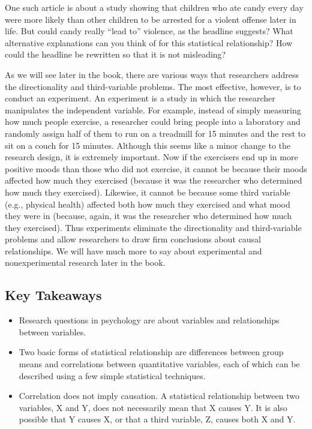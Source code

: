 \documentclass[]{book}
\theoremstyle{definition}
\theoremstyle{definition}
\theoremstyle{remark}
\begin{document}
One such article is about a study showing that children who ate candy
every day were more likely than other children to be arrested for a
violent offense later in life. But could candy really ``lead to''
violence, as the headline suggests? What alternative explanations can
you think of for this statistical relationship? How could the headline
be rewritten so that it is not misleading?

As we will see later in the book, there are various ways that
researchers address the directionality and third-variable problems. The
most effective, however, is to conduct an experiment. An experiment is a
study in which the researcher manipulates the independent variable. For
example, instead of simply measuring how much people exercise, a
researcher could bring people into a laboratory and randomly assign half
of them to run on a treadmill for 15 minutes and the rest to sit on a
couch for 15 minutes. Although this seems like a minor change to the
research design, it is extremely important. Now if the exercisers end up
in more positive moods than those who did not exercise, it cannot be
because their moods affected how much they exercised (because it was the
researcher who determined how much they exercised). Likewise, it cannot
be because some third variable (e.g., physical health) affected both how
much they exercised and what mood they were in (because, again, it was
the researcher who determined how much they exercised). Thus experiments
eliminate the directionality and third-variable problems and allow
researchers to draw firm conclusions about causal relationships. We will
have much more to say about experimental and nonexperimental research
later in the book.

\subsection{Key Takeaways}\label{key-takeaways-4}

\begin{itemize}
\item
  Research questions in psychology are about variables and relationships
  between variables.
\item
  Two basic forms of statistical relationship are differences between
  group means and correlations between quantitative variables, each of
  which can be described using a few simple statistical techniques.
\item
  Correlation does not imply causation. A statistical relationship
  between two variables, X and Y, does not necessarily mean that X
  causes Y. It is also possible that Y causes X, or that a third
  variable, Z, causes both X and Y.
\end{itemize}
\end{document}
